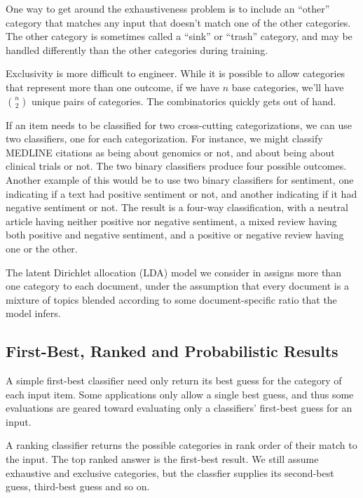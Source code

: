 One way to get around the exhaustiveness problem is to include an
``other'' category that matches any input that doesn't match one of
the other categories.  The other category is sometimes called a
``sink'' or ``trash'' category, and may be handled differently than
the other categories during training.

Exclusivity is more difficult to engineer.  While it is possible to
allow categories that represent more than one outcome, if we have $n$
base categories, we'll have ${n \choose 2}$ unique pairs of
categories.  The combinatorics quickly gets out of hand.

If an item needs to be classified for two cross-cutting
categorizations, we can use two classifiers, one for each
categorization.  For instance, we might classify MEDLINE citations as
being about genomics or not, and about being about clinical trials or
not.  The two binary classifiers produce four possible outcomes.
Another example of this would be to use two binary classifiers for
sentiment, one indicating if a text had positive sentiment or not, and
another indicating if it had negative sentiment or not.  The result is
a four-way classification, with a neutral article having neither
positive nor negative sentiment, a mixed review having both positive
and negative sentiment, and a positive or negative review having one
or the other.

The latent Dirichlet allocation (LDA) model we consider in
 assigns more than one category to each document, under
the assumption that every document is a mixture of topics blended
according to some document-specific ratio that the model infers.

\subsection{First-Best, Ranked and Probabilistic Results}

A simple first-best classifier need only return its best guess for the
category of each input item.  Some applications only allow a single
best guess, and thus some evaluations are geared toward evaluating
only a classifiers' first-best guess for an input.

A ranking classifier returns the possible categories in rank order of
their match to the input.  The top ranked answer is the first-best
result.  We still assume exhaustive and exclusive categories, but the
classfier supplies its second-best guess, third-best guess and so on.

